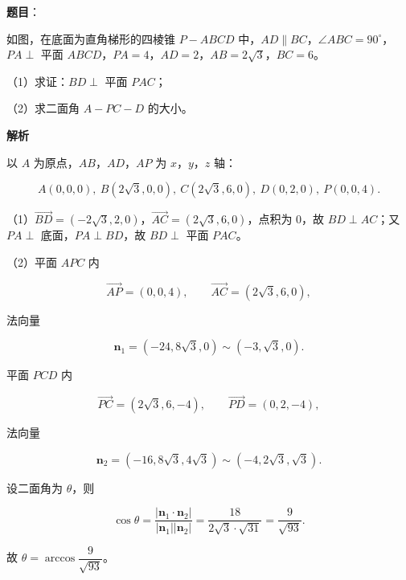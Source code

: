 \begin{answer}

\textbf{题目}：

如图，在底面为直角梯形的四棱锥 $P-ABCD$ 中，$AD\parallel BC$，$\angle ABC=90^\circ$，$PA\perp$ 平面 $ABCD$，$PA=4$，$AD=2$，$AB=2\sqrt3$，$BC=6$。

（1）求证：$BD\perp$ 平面 $PAC$；

（2）求二面角 $A-PC-D$ 的大小。
\nopagebreak[4]
\begin{center}\end{center}
\nopagebreak[4]
\textbf{解析}

以 $A$ 为原点，$AB$，$AD$，$AP$ 为 $x$，$y$，$z$ 轴：

\nopagebreak[4]
\[A(0,0,0),\ B(2\sqrt3,0,0),\ C(2\sqrt3,6,0),\ D(0,2,0),\ P(0,0,4).\]

（1）$\overrightarrow{BD}=(-2\sqrt3,2,0)$，$\overrightarrow{AC}=(2\sqrt3,6,0)$，点积为 $0$，故 $BD\perp AC$；又 $PA\perp$ 底面，$PA\perp BD$，故 $BD\perp$ 平面 $PAC$。

（2）平面 $APC$ 内

\nopagebreak[4]
\[\overrightarrow{AP}=(0,0,4),\qquad \overrightarrow{AC}=(2\sqrt3,6,0),\]

法向量

\nopagebreak[4]
\[\boldsymbol n_1=(-24,8\sqrt3,0)\sim(-3,\sqrt3,0).\]

平面 $PCD$ 内

\nopagebreak[4]
\[\overrightarrow{PC}=(2\sqrt3,6,-4),\qquad \overrightarrow{PD}=(0,2,-4),\]

法向量

\nopagebreak[4]
\[\boldsymbol n_2=(-16,8\sqrt3,4\sqrt3)\sim(-4,2\sqrt3,\sqrt3).\]

设二面角为 $\theta$，则

\nopagebreak[4]
\[\cos\theta=\frac{|\boldsymbol n_1\cdot\boldsymbol n_2|}{|\boldsymbol n_1||\boldsymbol n_2|}
=\frac{18}{2\sqrt3\cdot\sqrt{31}}=\frac9{\sqrt{93}}.\]

故 $\theta=\arccos\dfrac9{\sqrt{93}}$。


\end{answer}
